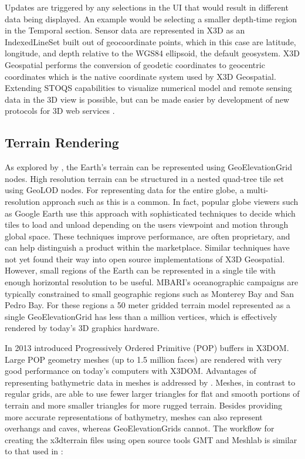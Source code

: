 \documentclass[conference]{IEEEtran}
\begin{document}
Updates are triggered by any selections in the UI that would result in different data being displayed. An example would be selecting a smaller depth-time region in the Temporal section. Sensor data are represented in X3D as an IndexedLineSet built out of geocoordinate points, which in this case are latitude, longitude, and depth relative to the WGS84 ellipsoid, the default geosystem. X3D Geospatial performs the conversion of geodetic coordinates to geocentric coordinates which is the native coordinate system used by X3D Geospatial. Extending STOQS capabilities to visualize numerical model and remote sensing data in the 3D view is possible, but can be made easier by development of new protocols for 3D web services \cite{McCann:2014:IXG:2628588.2628609}.

\subsection{Terrain Rendering}

As explored by \cite{yoo09}, the Earth's terrain can be represented using GeoElevationGrid nodes. High resolution terrain can be structured in a nested quad-tree tile set using GeoLOD nodes. For representing data for the entire globe, a multi-resolution approach such as this is a common. In fact, popular globe viewers such as Google Earth use this approach with sophisticated techniques to decide which tiles to load and unload depending on the users viewpoint and motion through global space. These techniques improve performance, are often proprietary, and can help distinguish a product within the marketplace. Similar techniques have not yet found their way into open source implementations of X3D Geospatial. However, small regions of the Earth can be represented in a single tile with enough horizontal resolution to be useful. MBARI's oceanographic campaigns are typically constrained to small geographic regions such as Monterey Bay and San Pedro Bay. For these regions a 50 meter gridded terrain model represented as a single GeoElevationGrid has less than a million vertices, which is effectively  rendered by today's 3D graphics hardware.

In 2013 \cite{Limper:2013:FDW:2466533.2466536} introduced Progressively Ordered Primitive (POP) buffers in X3DOM. Large POP geometry meshes (up to 1.5 million faces) are rendered with very good performance on today's computers with X3DOM. Advantages of representing bathymetric data in meshes is addressed by \cite{Becker:2005:NPN:1650409.1650513}. Meshes, in contrast to regular grids, are able to use fewer larger triangles for flat and smooth portions of terrain and more smaller triangles for more rugged terrain. Besides providing more accurate representations of bathymetry, meshes can also represent overhangs and caves, whereas GeoElevationGrids cannot. The workflow for creating the x3dterrain files using open source tools GMT \cite{GMT} and Meshlab \cite{Meshlab} is similar to that used in \cite{Silvestre}:
\end{document}
